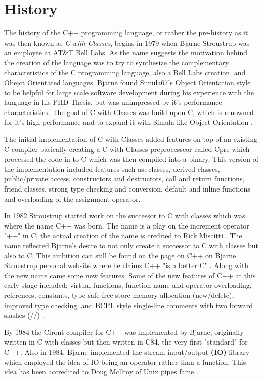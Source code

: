 \documentclass[conference, a4paper]{IEEEtran}
\begin{document}
\section{History}
The history of the C++ programming language, or rather the pre-history as it was then known as \textit{C with Classes}, begins in 1979 when Bjarne Stroustrup was an employee at AT\&T Bell Labs. As the name suggests the motivation behind the creation of the language was to try to synthesize the complementary characteristics of the C programming language, also a Bell Labs creation, and Obejct Orientated languages. Bjarne found Simula67's Object Orientation style to be helpful for large scale software development during his experience with the language in his PHD Thesis, but was unimpressed by it's performance characteristics. The goal of C with Classes was build upon C, which is renowned for it's high performance and to expand it with Simula like Object Orientation \cite{cppevolving}.

The initial implementation of C with Classes added features on top of an existing C compiler basically creating a C with Classes preprocesseor called Cpre which processed the code in to C which was then compiled into a binary. This version of the implementation included features such as; classes, derived classes, public/private access, constructors and destructors, call and return functions, friend classes, strong type checking and conversion, default and inline functions and overloading of the assignment operator. 

In 1982 Stroustrup started work on the successor to C with classes which was where the name C++ was born. The name is a play on the increment operator "++" in C, the actual creation of the name is credited to Rick Miscitti \cite{cpphistory}. The name reflected Bjarne's desire to not only create a successor to C with classes but also to C. This ambition can still be found on the page on C++ on Bjarne Stroustrup personal website where he claims C++ "is a better C" \cite{cpphome}. Along with the new name came some new features. Some of the new features of C++ at this early stage included; virtual functions, function name and operator overloading, references, constants, type-safe free-store memory allocation (new/delete), improved type checking, and BCPL style single-line comments with two forward slashes (//) \cite{cpphistory}. 

By 1984 the Cfront compiler for C++ was implemented by Bjarne, originally written in C with classes but then written in C84, the very first "standard" for C++. Also in 1984, Bjarne implemented the stream input/output \textbf{(IO)} library which employed the idea of IO being an operator rather than a function. This idea has been accredited to Doug Mcllroy of Unix pipes fame \cite{cpphistory}. 
\end{document}
